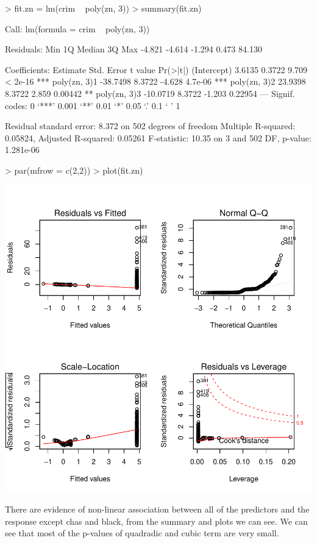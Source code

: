 \documentclass[a4paper]{article}
\begin{document}
\begin{Schunk}
\begin{Sinput}
> fit.zn = lm(crim ~ poly(zn, 3))
> summary(fit.zn)
\end{Sinput}
\begin{Soutput}
Call:
lm(formula = crim ~ poly(zn, 3))

Residuals:
   Min     1Q Median     3Q    Max 
-4.821 -4.614 -1.294  0.473 84.130 

Coefficients:
             Estimate Std. Error t value Pr(>|t|)    
(Intercept)    3.6135     0.3722   9.709  < 2e-16 ***
poly(zn, 3)1 -38.7498     8.3722  -4.628  4.7e-06 ***
poly(zn, 3)2  23.9398     8.3722   2.859  0.00442 ** 
poly(zn, 3)3 -10.0719     8.3722  -1.203  0.22954    
---
Signif. codes:  0 ‘***’ 0.001 ‘**’ 0.01 ‘*’ 0.05 ‘.’ 0.1 ‘ ’ 1

Residual standard error: 8.372 on 502 degrees of freedom
Multiple R-squared:  0.05824,	Adjusted R-squared:  0.05261 
F-statistic: 10.35 on 3 and 502 DF,  p-value: 1.281e-06
\end{Soutput}
\begin{Sinput}
> par(mfrow = c(2,2))
> plot(fit.zn)
\end{Sinput}
\end{Schunk}
\includegraphics{mutivariblelm-zn2}
\begin{enumerate}
{\color{red}
\item There are evidence of non-linear association between all of the predictors and the response except chas and black, from the summary and plots we can see. We can see that most of the p-values of quadradic and cubic term are very small.
}
\end{enumerate}
\end{document}
